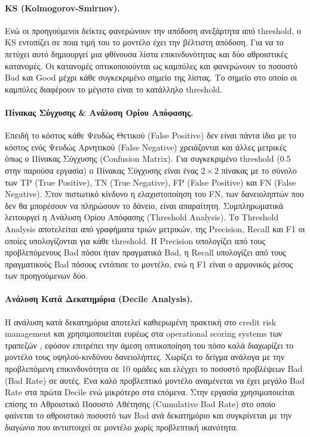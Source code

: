 \paragraph{KS (Kolmogorov-Smirnov).}
Ενώ οι προηγούμενοι δείκτες φανερώνουν την απόδοση ανεξάρτητα από threshold,
ο KS εντοπίζει σε ποια τιμή του το μοντέλο έχει την βέλτιστη απόδοση. Για να
το πετύχει αυτό δημιουργεί μια φθίνουσα λίστα επικινδυνότητας και δύο αθροιστικές
κατανομές. Οι κατανομές οπτικοποιούνται ως καμπύλες και φανερώνουν το ποσοστό
Bad και Good μέχρι κάθε συγκεκριμένο σημείο της λίστας. Το σημείο στο οποίο οι
καμπύλες διαφέρουν το μέγιστο είναι το κατάλληλο threshold.

\paragraph{Πίνακας Σύγχυσης \& Ανάλυση Ορίου Απόφασης.}
Επειδή το κόστος κάθε Ψευδώς Θετικού (False Positive) δεν είναι πάντα ίδιο
με το κόστος ενός Ψευδώς Αρνητικού (False Negative) χρειάζονται και άλλες μετρικές
όπως ο Πίνακας Σύγχυσης (Confusion Matrix). Για συγκεκριμένο threshold (0.5 στην
παρούσα εργασία) ο Πίνακας Σύγχυσης είναι ένας $2\times2$ πίνακας με το σύνολο
των TP (True Positive), TN (True Negative), FP (False Positive) και FN (False
Negative). Στον πιστωτικό κίνδυνο η ελαχιστοποίηση του FN, των δανειοληπτών που
δεν θα μπορέσουν να πληρώσουν το δάνειο, είναι απαραίτητη. Συμπληρωματικά
λειτουργεί η Ανάλυση Ορίου Απόφασης (Threshold Analysis). Το Threshold Analysis
αποτελείται από γραφήματα τριών μετρικών, της Precision, Recall και F1 οι οποίες
υπολογίζονται για κάθε threshold. Η Precision υπολογίζει από τους προβλεπόμενους
Bad πόσοι ήταν πραγματικά Bad, η Recall υπολογίζει από τους πραγματικούς Bad
πόσους εντόπισε το μοντέλο, ενώ η F1 είναι ο αρμονικός μέσος των προηγούμενων
δύο.

\paragraph{Ανάλυση Κατά Δεκατημόρια (Decile Analysis).}

Η ανάλυση κατά δεκατημόρια αποτελεί καθιερωμένη πρακτική στο credit risk management 
και χρησιμοποιείται ευρέως στα operational scoring systems των τραπεζών \citep{anderson2007credit, siddiqi2017intelligent}, 
εφόσον επιτρέπει την άμεση οπτικοποίηση του πόσο καλά διαχωρίζει το μοντέλο τους υψηλού-κινδύνου δανειολήπτες.
Χωρίζει το δείγμα ανάλογα με την
προβλεπόμενη επικινδυνότητα σε 10 ομάδες και ελέγχει το ποσοστό προβλέψεων Bad
(Bad Rate) σε αυτές. Ένα καλό προβλεπτικό μοντέλο αναμένεται να έχει μεγάλο
Bad Rate στα πρώτα Decile ενώ μικρότερο στα επόμενα. Στην εργασία χρησιμοποιείται
επίσης το Αθροιστικό Ποσοστό Αθέτησης (Cumulative Bad Rate) στο οποίο φαίνεται
το αθροιστικό ποσοστό των Bad ανά δεκατημόριο και συγκρίνεται με την διαγώνιο
που αντιστοιχεί σε μοντέλο χωρίς προβλεπτική ικανότητα.


